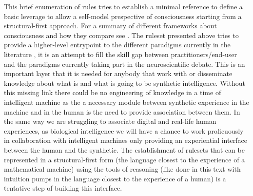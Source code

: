 \documentclass[14pt,a4paper]{extarticle}
\begin{document}
This brief enumeration of rules tries to establish a minimal reference to define a basic leverage to allow a self-model prespective of consciousness starting from a structural-first approach. For a summary of different frameworks about consciousness and how they compare see \cite{SchuGraz/niac001}. The ruleset presented above tries to provide a higher-level entrypoint to the different paradigms currently in the literature \cite{SchuGraz/niac001}, it is an attempt to fill the skill gap between practitioners/end-user and the paradigms currently taking part in the neuroscientific debate. This is an important layer that it is needed for anybody that work with or disseminate knowledge about what is and what is going to be synthetic intelligence. Without this missing link there could be no engineering of knowledge in a time of intelligent machine as the a necessary module between synthetic experience in the machine and in the human is the need to provide association between them. In the same way we are struggling to associate digital and real-life human experiences, as biological intelligence we will have a chance to work proficuously in collaboration with intelligent machines only providing an experiential interface between the human and the synthetic. The establishment of rulesets that can be represented in a structural-first form (the language closest to the experience of a mathematical machine) using the tools of reasoning (like done in this text with intuition pumps in the language closest to the experience of a human) is a tentative step of building this interface.   
\end{document}

